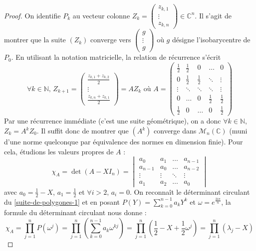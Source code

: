   \begin{proof}
    On identifie $P_k$ au vecteur colonne $Z_k = \begin{pmatrix} z_{k,1} \\ \vdots \\ z_{k,n} \end{pmatrix} \in \mathbb{C}^n$. Il s'agit de montrer que la suite $(Z_k)$ converge vers $\begin{pmatrix} g \\ \vdots \\ g \end{pmatrix}$ où $g$ désigne l'isobarycentre de $P_0$.
    \newpar
    En utilisant la notation matricielle, la relation de récurrence s'écrit
    \[ \forall k \in \mathbb{N}, \, Z_{k+1} = \begin{pmatrix} \frac{z_{k,1} + z_{k,2}}{2} \\ \vdots \\ \frac{z_{k,n} + z_{k,1}}{2} \end{pmatrix} = AZ_k \text{ où } A = \begin{pmatrix} \frac{1}{2} & \frac{1}{2} & 0 & \dots & 0 \\ 0 & \frac{1}{2} & \frac{1}{2} & \ddots & \vdots \\ \vdots & \ddots & \ddots & \ddots & \vdots \\ 0 & \dots & 0 & \frac{1}{2} & \frac{1}{2} \\ \frac{1}{2} & 0 & \dots & 0 & \frac{1}{2} \end{pmatrix} \]
    Par une récurrence immédiate (c'est une suite géométrique), on a donc $\forall k \in \mathbb{N}$, $Z_k = A^k Z_0$. Il suffit donc de montrer que $(A^k)$ converge dans $\mathcal{M}_n(\mathbb{C})$ (muni d'une norme quelconque par équivalence des normes en dimension finie).
    \newpar
    Pour cela, étudions les valeurs propres de $A$ :
    \[ \chi_A = \det(A - X I_n) = \begin{vmatrix} a_0 & a_1 & \dots & a_{n-1} \\ a_{n-1} & a_0 & \dots & a_{n-2}\\ \vdots & \vdots & \ddots & \vdots \\ a_1 & a_2 & \dots & a_0 \end{vmatrix} \]
    avec $a_0 = \frac{1}{2} - X$, $a_1 = \frac{1}{2}$ et $\forall i > 2, \, a_i = 0$. On reconnaît le déterminant circulant du \cref{suite-de-polygones-1} et en posant $P(Y) = \sum_{k=0}^{n-1} a_k Y^k$ et $\omega = e^{\frac{2i\pi}{n}}$, la formule du déterminant circulant nous donne :
    \[ \chi_A = \prod_{j=1}^n P(\omega^j) = \prod_{j=1}^n \left( \sum_{k=0}^{n-1} a_k \omega^{kj} \right) = \prod_{j=1}^n \left( \frac{1}{2} - X + \frac{1}{2} \omega^j \right) = \prod_{j=1}^n (\lambda_j - X) \]

\end{proof}

